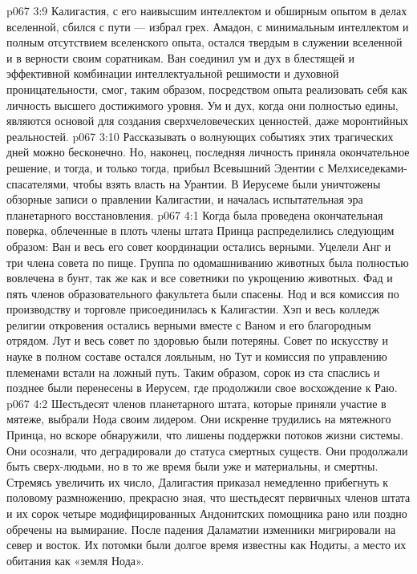 \vs p067 3:9 Калигастия, с его наивысшим интеллектом и обширным опытом в делах вселенной, сбился с пути --- избрал грех. Амадон, с минимальным интеллектом и полным отсутствием вселенского опыта, остался твердым в служении вселенной и в верности своим соратникам. Ван соединил ум и дух в блестящей и эффективной комбинации интеллектуальной решимости и духовной проницательности, смог, таким образом, посредством опыта реализовать себя как личность высшего достижимого уровня. Ум и дух, когда они полностью едины, являются основой для создания сверхчеловеческих ценностей, даже моронтийных реальностей.
\vs p067 3:10 Рассказывать о волнующих событиях этих трагических дней можно бесконечно. Но, наконец, последняя личность приняла окончательное решение, и тогда, и только тогда, прибыл Всевышний Эдентии с Мелхиседеками\hyp{}спасателями, чтобы взять власть на Урантии. В Иерусеме были уничтожены обзорные записи о правлении Калигастии, и началась испытательная эра планетарного восстановления.
\vs p067 4:1 Когда была проведена окончательная поверка, облеченные в плоть члены штата Принца распределились следующим образом: Ван и весь его совет координации остались верными. Уцелели Анг и три члена совета по пище. Группа по одомашниванию животных была полностью вовлечена в бунт, так же как и все советники по укрощению животных. Фад и пять членов образовательного факультета были спасены. Нод и вся комиссия по производству и торговле присоединилась к Калигастии. Хэп и весь колледж религии откровения остались верными вместе с Ваном и его благородным отрядом. Лут и весь совет по здоровью были потеряны. Совет по искусству и науке в полном составе остался лояльным, но Тут и комиссия по управлению племенами встали на ложный путь. Таким образом, сорок из ста спаслись и позднее были перенесены в Иерусем, где продолжили свое восхождение к Раю.
\vs p067 4:2 Шестьдесят членов планетарного штата, которые приняли участие в мятеже, выбрали Нода своим лидером. Они искренне трудились на мятежного Принца, но вскоре обнаружили, что лишены поддержки потоков жизни системы. Они осознали, что деградировали до статуса смертных существ. Они продолжали быть сверх\hyp{}людьми, но в то же время были уже и материальны, и смертны. Стремясь увеличить их число, Далигастия приказал немедленно прибегнуть к половому размножению, прекрасно зная, что шестьдесят первичных членов штата и их сорок четыре модифицированных Андонитских помощника рано или поздно обречены на вымирание. После падения Даламатии изменники мигрировали на север и восток. Их потомки были долгое время известны как Нодиты, а место их обитания как «земля Нода».
